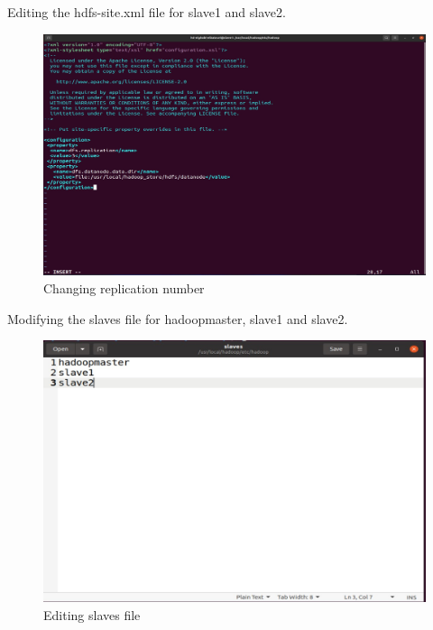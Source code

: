 \begin{spacing}{1.2}
\par Editing the hdfs-site.xml file for slave1 and slave2.
\\
\begin{figure}[!htb] 
\begin{center} 
\includegraphics[width=1\linewidth]{Big_Data/Hadoop/Multi-Nodes Cluster/Changing replication number} 
\end{center} 
\caption{Changing replication number} 
\end{figure} 
\FloatBarrier

\par Modifying the slaves file for hadoopmaster, slave1 and slave2.
\\
\begin{figure}[!htb] 
\begin{center} 
\includegraphics[width=1\linewidth]{Big_Data/Hadoop/Multi-Nodes Cluster/Editing slaves file} 
\end{center} 
\caption{Editing slaves file} 
\end{figure} 
\FloatBarrier


\end{spacing}
